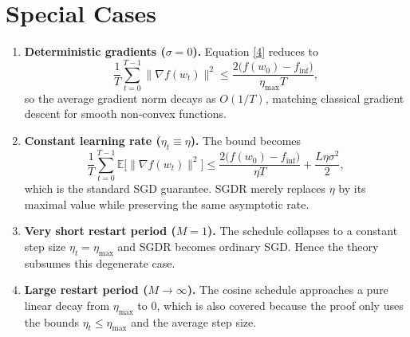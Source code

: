 \documentclass{article}
\begin{document}
\section*{Special Cases}
\begin{enumerate}
\item \textbf{Deterministic gradients ($\sigma=0$).}  
Equation \eqref{4} reduces to
\[
\frac{1}{T}\sum_{t=0}^{T-1}\|\nabla f(w_t)\|^2
\le \frac{2\big(f(w_0)-f_{\inf}\big)}{\eta_{\max} T},
\]
so the average gradient norm decays as $O(1/T)$, matching classical gradient descent for smooth non‑convex functions.

\item \textbf{Constant learning rate ($\eta_t\equiv\eta$).}  
The bound becomes
\[
\frac{1}{T}\sum_{t=0}^{T-1}\mathbb{E}\!\big[\|\nabla f(w_t)\|^2\big]
\le \frac{2\big(f(w_0)-f_{\inf}\big)}{\eta T}
+\frac{L\eta\sigma^2}{2},
\]
which is the standard SGD guarantee. SGDR merely replaces $\eta$ by its maximal value while preserving the same asymptotic rate.

\item \textbf{Very short restart period ($M=1$).}  
The schedule collapses to a constant step size $\eta_t=\eta_{\max}$ and SGDR becomes ordinary SGD. Hence the theory subsumes this degenerate case.

\item \textbf{Large restart period ($M\to\infty$).}  
The cosine schedule approaches a pure linear decay from $\eta_{\max}$ to $0$, which is also covered because the proof only uses the bounds $\eta_t\le\eta_{\max}$ and the average step size.
\end{enumerate}
\end{document}

